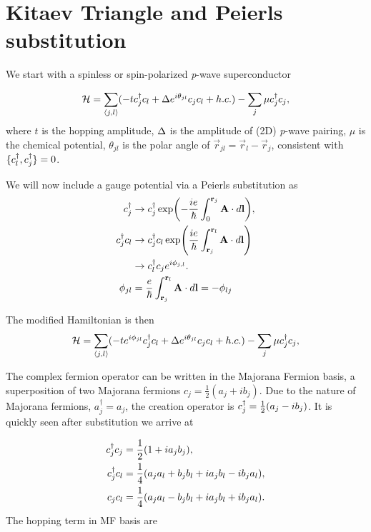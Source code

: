 \section{Kitaev Triangle and Peierls substitution}

We start with a spinless or spin-polarized \textit{p}-wave superconductor

\begin{equation}
  \mathcal{H} = \sum_{\langle j, l \rangle} (-tc^{\dagger}_{j} c_l + \Delta e^{i\theta_{jl}} c_{j} c_l + h.c.) - \sum_j \mu c^{\dagger}_j c_j,
\end{equation}
where $t$ is the hopping amplitude, $\Delta$  is the amplitude of (2D) \textit{p}-wave pairing, $\mu$ is the chemical potential, $\theta_{jl}$ is the polar angle of $\vec{r}_{jl} = \vec{r}_l - \vec{r}_j$, consistent with $\{c^{\dagger}_l, c^{\dagger}_j\} = 0$.

We will now include a gauge potential via a Peierls substitution as
\begin{align}\label{eq:Peierls-phase}
  c^{\dagger}_j &\rightarrow c^{\dagger}_j \exp(-\dfrac{i e}{\hbar} \int_0^{\mathbf{r}_j} \mathbf{A} \cdot d\mathbf{l}), \nonumber \\
  c^{\dagger}_j c_l &\rightarrow c^{\dagger}_j c_l \exp(\dfrac{i e}{\hbar} \int_{\mathbf{r}_j}^{\mathbf{r}_l} \mathbf{A} \cdot d\mathbf{l}) \nonumber \\
  &\rightarrow c^{\dagger}_l c_j e^{i \phi_{j,l}}. \nonumber \\
  \phi_{jl} &= \dfrac{e}{\hbar} \int_{\mathbf{r}_j}^{\mathbf{r}_l} \mathbf{A} \cdot d\mathbf{l} = -\phi_{lj}
\end{align}

The modified Hamiltonian is then
\begin{equation}
  \mathcal{H} = \sum_{\langle j, l \rangle} (-t e^{i\phi_{jl}} c^{\dagger}_{j} c_l + \Delta e^{i\theta_{jl}} c_{j} c_l + h.c.) - \sum_j \mu c^{\dagger}_j c_j,
\end{equation}

The complex fermion operator can be written in the Majorana Fermion basis, a superposition of two Majorana fermions $c_j = \frac{1}{2} (a_j + i b_j)$.
Due to the nature of Majorana fermions, $a^{\dagger}_j = a_j$, the creation operator is $c^{\dagger}_j = \frac{1}{2} (a_j - i b_j)$.
It is quickly seen after substitution we arrive at

\begin{align}
  c^{\dagger}_j c_j &= \frac{1}{2} (1 + i a_j b_j), \\
  c^{\dagger}_j c_l &= \frac{1}{4} (a_j a_l + b_j b_l + i a_j b_l - i b_j a_l), \\
  c_j c_l &= \frac{1}{4} (a_j a_l - b_j b_l + i a_j b_l + i b_j a_l).
\end{align}
The hopping term in MF basis are

